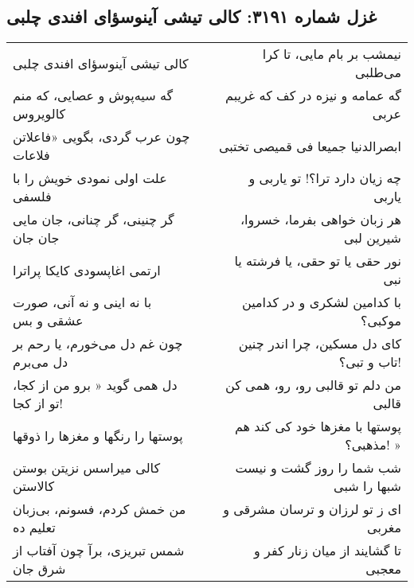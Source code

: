 \begin{center}
\section*{غزل شماره ۳۱۹۱: کالی تیشی آینوسؤای افندی چلبی}
\label{sec:3191}
\begin{longtable}{l p{0.5cm} r}
کالی تیشی آینوسؤای افندی چلبی
&&
نیمشب بر بام مایی، تا کرا می‌طلبی
\\
گه سیه‌پوش و عصایی، که منم کالویروس
&&
گه عمامه و نیزه در کف که غریبم عربی
\\
چون عرب گردی، بگویی «فاعلاتن فلاعات
&&
ابصرالدنیا جمیعا فی قمیصی تختبی
\\
علت اولی نمودی خویش را با فلسفی
&&
چه زیان دارد ترا؟! تو یاربی و یاربی
\\
گر چنینی، گر چنانی، جان مایی جان جان
&&
هر زبان خواهی بفرما، خسروا، شیرین لبی
\\
ارتمی اغاپسودی کایکا پراترا
&&
نور حقی یا تو حقی، یا فرشته یا نبی
\\
با نه اینی و نه آنی، صورت عشقی و بس
&&
با کدامین لشکری و در کدامین موکبی؟
\\
چون غم دل می‌خورم، یا رحم بر دل می‌برم
&&
کای دل مسکین، چرا اندر چنین تاب و تبی؟!
\\
دل همی گوید « برو من از کجا، تو از کجا!
&&
من دلم تو قالبی رو، رو، همی کن قالبی
\\
پوستها را رنگها و مغزها را ذوقها
&&
پوستها با مغزها خود کی کند هم مذهبی؟! »
\\
کالی میراسس نزیتن بوستن کالاستن
&&
شب شما را روز گشت و نیست شبها را شبی
\\
من خمش کردم، فسونم، بی‌زبان تعلیم ده
&&
ای ز تو لرزان و ترسان مشرقی و مغربی
\\
شمس تبریزی، برآ چون آفتاب از شرق جان
&&
تا گشایند از میان زنار کفر و معجبی
\\
\end{longtable}
\end{center}
